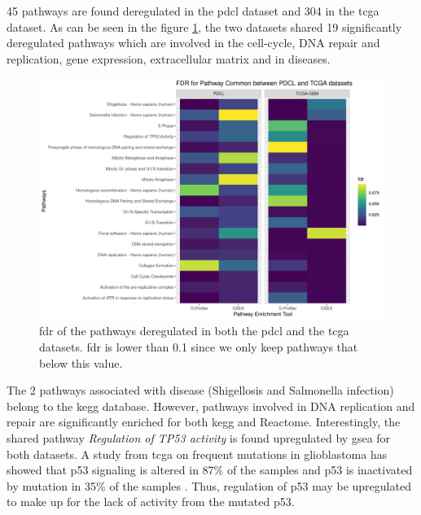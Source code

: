 45 pathways are found deregulated in the \acrshort{pdcl} dataset and 304 in the \acrshort{tcga} dataset.
As can be seen in the figure \ref{fig:heatmap-fdr-global-tcga}, the two datasets shared 19 significantly deregulated pathways which are involved in the cell-cycle, DNA repair and replication, gene expression, extracellular matrix and in diseases.
\begin{figure}
    \includegraphics[width=\textwidth]{img/heatmap-fdr-global-tcga}
    \caption{
        \acrfull{fdr} of the pathways deregulated in both the \acrshort{pdcl} and the \acrshort{tcga} datasets.
        \acrshort{fdr} is lower than 0.1 since we only keep pathways that below this value.
    }
    \label{fig:heatmap-fdr-global-tcga}
\end{figure}
The 2 pathways associated with disease (Shigellosis and Salmonella infection) belong to the \acrshort{kegg} database.
However, pathways involved in DNA replication and repair are significantly enriched for both \acrshort{kegg} and Reactome.
Interestingly, the shared pathway \textit{Regulation of TP53 activity} is found upregulated by \acrshort{gsea} for both datasets.
A study from \acrshort{tcga} on frequent mutations in glioblastoma has showed that p53 signaling is altered  in 87\% of the samples and p53 is inactivated by mutation in 35\% of the samples \cite*{McLendon2008}.
Thus, regulation of p53 may be upregulated to make up for the lack of activity from the mutated p53.

